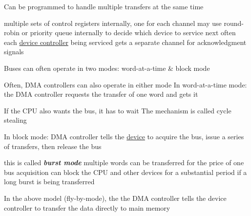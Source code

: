\begin{itemize}

    \vItem
          Can be programmed to handle multiple transfers at the same time

          \begin{itemize}

              \vItem
                    multiple sets of control registers internally, one for each channel
              \vItem
                    may use round-robin or priority queue internally to decide which
                    device to service next
              \vItem
                    often each \ul{device controller} being serviced gets a separate channel for
                    acknowledgment signals
          \end{itemize}
    \vItem
          Buses can often operate in two modes: word-at-a-time \& block mode

          \begin{itemize}

              \vItem
                    Often, DMA controllers can also operate in either mode
              \vItem
                    In word-at-a-time mode: the DMA controller requests the transfer of
                    one word and gets it

                    \begin{itemize}

                        \vItem
                              If the CPU also wants the bus, it has to wait
                        \vItem
                              The mechanism is called cycle stealing
                    \end{itemize}
              \vItem
                    In block mode: DMA controller tells the \ul{device} to acquire the bus, issue
                    a series of transfers, then release the bus

                    \begin{itemize}

                        \vItem
                              this is called \textbf{ \textit{burst mode}}
                        \vItem
                              multiple words can be transferred for the price of one bus
                              acquisition
                        \vItem
                              can block the CPU and other devices for a substantial period if a
                              long burst is being transferred
                    \end{itemize}
          \end{itemize}
    \vItem
          In the above model (fly-by-mode), the the DMA controller tells the
          device controller to transfer the data directly to main memory


\end{itemize}
